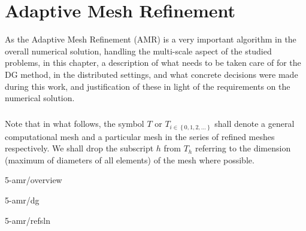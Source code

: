 \chapter{Adaptive Mesh Refinement}
As the Adaptive Mesh Refinement (AMR) is a very important algorithm in the overall numerical solution, handling the multi-scale aspect of the studied problems, in this chapter, a description of what needs to be taken care of for the DG method, in the distributed settings, and what concrete decisions were made during this work, and justification of these in light of the requirements on the numerical solution.
\paragraph{}
Note that in what follows, the symbol $T$ or $T_{i\in\left\{0, 1, 2, ...\right\}}$ shall denote a general computational mesh and a particular mesh in the series of refined meshes respectively. We shall drop the subscript $h$ from $T_h$ referring to the dimension (maximum of diameters of all elements) of the mesh where possible.

 {5-amr/overview}

 {5-amr/dg}

 {5-amr/refsln}
